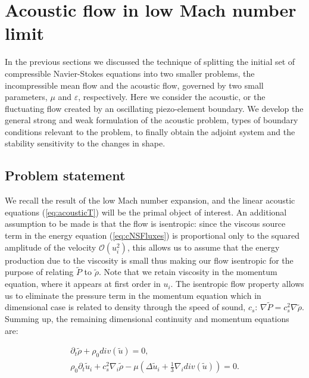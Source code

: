 \section{Acoustic flow in low Mach number limit}

In the previous sections we discussed the technique of splitting the initial set of compressible Navier-Stokes equations into two smaller problems, the incompressible mean flow and the acoustic flow, governed by two small parameters, $\mu$ and $\varepsilon$, respectively. Here we consider the acoustic, or the fluctuating flow created by an oscillating piezo-element boundary. We develop the general strong and weak formulation of the acoustic problem, types of boundary conditions relevant to the problem, to finally obtain the adjoint system and the stability sensitivity to the changes in shape.

\subsection{Problem statement}

We recall the result of the low Mach number expansion, and the linear acoustic equations (\ref{eq:acousticT}) will be the primal object of interest. An additional assumption to be made is that the flow is isentropic: since the viscous source term in the energy equation (\ref{eq:cNSFluxes}) is proportional only to the squared amplitude of the velocity $\mathcal{O}(u_i^2)$, this allows us to assume that the energy production due to the viscosity is small thus making our flow isentropic for the purpose of relating $\tilde{P}$ to $\tilde{\rho}$. Note that we retain viscosity in the momentum equation, where it appears at first order in $u_i$. The isentropic flow property allows us to eliminate the pressure term in the momentum equation which in dimensional case is related to density through the speed of sound, $c_s$: $\nabla \tilde{P} = c_s^2 \nabla \tilde{\rho}$. Summing up, the remaining dimensional continuity and momentum equations are:

\begin{subequations}
\label{eq:linNS}
\begin{align}
        \partial_t \tilde{\rho} + \rho_0 div(\tilde{u}) = 0, \\
        \rho_0 \partial_t \tilde{u}_i + c_s^2 \nabla_i \tilde{\rho} - \mu \left(\Delta \tilde{u}_i + \frac{1}{3} \nabla_i div(\tilde{u}) \right) = 0.
\end{align}
\end{subequations}

